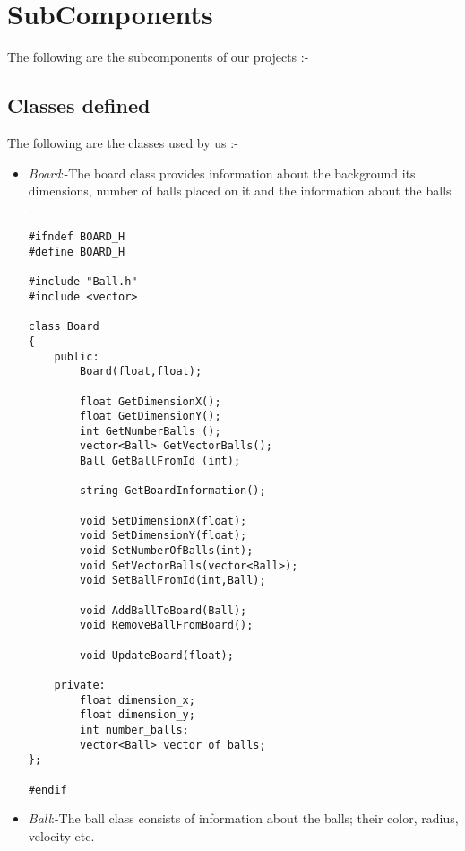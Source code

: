 \section{SubComponents}
The following are the subcomponents of our projects :-
\subsection{Classes defined}
The following are the classes used by us :-
\begin{itemize}
\item \textit{Board}:-The board class provides information about the background its dimensions, number of balls placed on it and the information about the balls .


%

\begin{lstlisting}
#ifndef BOARD_H
#define BOARD_H

#include "Ball.h"
#include <vector>

class Board
{
	public:
		Board(float,float);

		float GetDimensionX();
		float GetDimensionY();
		int GetNumberBalls ();
		vector<Ball> GetVectorBalls();
		Ball GetBallFromId (int);

		string GetBoardInformation();

		void SetDimensionX(float);
		void SetDimensionY(float);
		void SetNumberOfBalls(int);
		void SetVectorBalls(vector<Ball>);
		void SetBallFromId(int,Ball);

		void AddBallToBoard(Ball);
		void RemoveBallFromBoard();
		
		void UpdateBoard(float);

	private:
		float dimension_x;
		float dimension_y;
		int number_balls;
		vector<Ball> vector_of_balls;
};

#endif
\end{lstlisting}
%
\item \textit{Ball}:-The ball class consists of information about the balls; their color, radius, velocity etc.
\end{itemize}
